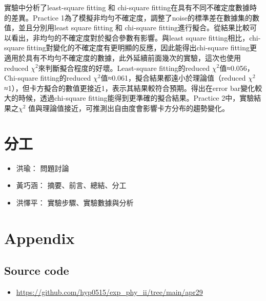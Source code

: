 \documentclass[12pt,a4paper]{article}
\begin{document}
\begin{CJK}{UTF8}{bkai}
實驗中分析了least-square fitting 和 chi-square fitting在具有不同不確定度數據時的差異。Practice 1為了模擬非均勻不確定度，調整了noise的標準差在數據集的數值，並且分別用least square fitting 和 chi-square fitting進行擬合。從結果比較可以看出，非均勻的不確定度對於擬合參數有影響。與least square fitting相比，chi-square fitting對變化的不確定度有更明顯的反應，因此能得出chi-square fitting更適用於具有不均勻不確定度的數據，此外延續前面幾次的實驗，這次也使用reduced $\chi^2$來判斷擬合程度的好壞。Least-square fitting的reduced $\chi^2$值≈0.056，Chi-square fitting的reduced $\chi^2$值≈0.061，擬合結果都遠小於理論值（reduced $\chi^2$≈1），但卡方擬合的數值更接近1，表示其結果較符合預期。得出在error bar變化較大的時候，透過chi-square fitting能得到更準確的擬合結果。Practice 2中，實驗結果之$\chi^2$ 值與理論值接近，可推測出自由度會影響卡方分布的趨勢變化。



\section{分工}
\begin{itemize}
    \item 洪瑜： 問題討論
    \item 黃巧涵： 摘要、前言、總結、分工
    \item 洪懌平： 實驗步驟、實驗數據與分析
\end{itemize}

\section{Appendix}

\subsection{Source code}

\begin{itemize}
    \item \url{https://github.com/hyp0515/exp_phy_ii/tree/main/apr29}
\end{itemize}

\end{CJK}
\end{document}
